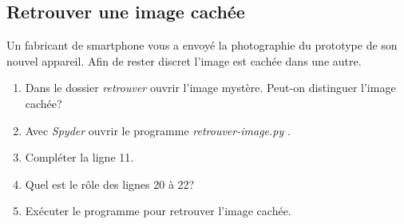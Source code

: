 \documentclass[a4paper,11pt]{article}
\begin{document}
\begin{Form}
\section{Retrouver une image cachée}
Un fabricant de smartphone vous a envoyé la photographie du prototype de son nouvel appareil. Afin de rester discret l'image est cachée dans une autre.
\begin{activite}
\begin{enumerate}
\item Dans le dossier \emph{retrouver} ouvrir l'image mystère. Peut-on distinguer l'image cachée?
\item Avec \emph{Spyder} ouvrir le programme \emph{retrouver-image.py} .
\item Compléter la ligne 11.
\item Quel est le rôle des lignes 20 à 22?
\item Exécuter le programme pour retrouver l'image cachée.
\end{enumerate}
\end{activite}
\end{Form}
\end{document}

